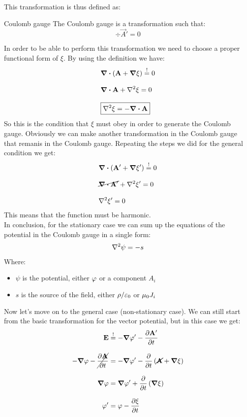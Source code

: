 This transformation is thus defined as:
\begin{definition}{Coulomb gauge}
  The Coulomb gauge is a transformation such that:
  \begin{equation}
    \div{\vec{A}'} = 0
  \end{equation}
\end{definition}
\noindent In order to be able to perform this transformation we need to choose a proper functional form of $\xi$. By using the definition we have:
\begin{equation}
  \begin{split}
    &\div{\brackets{\vec{A}+\grad{\xi}}} \overset{!}{=} 0 \\[8pt]
    &\div{\vec{A}} + \lap{\xi} = 0 \\[8pt]
    &\boxed{\lap{\xi} = -\div{\vec{A}}}
  \end{split}
\end{equation}
So this is the condition that $\xi$ must obey in order to generate the Coulomb gauge. Obviously we can make another transformation in the Coulomb gauge that remanis in the Coulomb gauge. Repeating the steps we did for the general condition we get:
\begin{equation}
  \begin{split}
    &\div{\brackets{\vec{A}'+\grad{\xi'}}} \overset{!}{=} 0 \\[8pt]
    &\cancel{\div{\vec{A}'}} + \lap{\xi'} = 0 \\[8pt]
    &\lap{\xi'} = 0
  \end{split}
\end{equation}
This means that the function must be harmonic.\\
In conclusion, for the stationary case we can sum up the equations of the potential in the Coulomb gauge in a single form:
\begin{equation}
  \lap{\psi} = -s
\end{equation}
Where:
\begin{itemize}
  \item $\psi$ is the potential, either $\varphi$ or a component $A_i$
  \item $s$ is the source of the field, either $\rho/\varepsilon_0$ or $\mu_0 J_i$
\end{itemize}
Now let's move on to the general case (non-stationary case). We can still start from the basic transformation for the vector potential, but in this case we get:
\begin{equation}
  \begin{split}
    \vec{E} &\overset{!}{=} -\grad{\potE'} - \pdv{\vec{A'}}{t} \\[8pt]
    -\grad{\potE} - \cancel{\pdv{\vec{A}}{t}} &= -\grad{\potE'} - \pdv{}{t}\brackets{\cancel{\vec{A}} + \grad{\xi}} \\[8pt]
    \grad{\potE} &= \grad{\potE'} + \pdv{}{t}\brackets{\grad{\xi}} \\[8pt]
    \potE' &= \potE - \pdv{\xi}{t}
  \end{split}
\end{equation}
